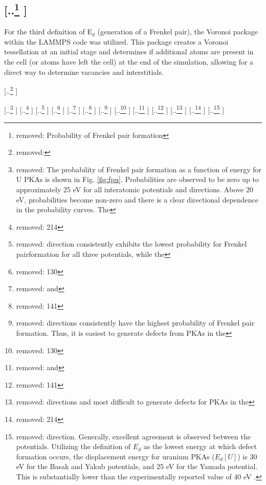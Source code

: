 \documentclass[review]{elsarticle} %
\providecommand{\DIFaddtex}[1]{{\protect\color{blue} \sf #1}} %
\providecommand{\DIFdeltex}[1]{{\protect\color{red} [..\footnote{removed: #1} ]}} %
\providecommand{\DIFaddbegin}{} %
\providecommand{\DIFaddend}{} %
\providecommand{\DIFdelbegin}{} %
\providecommand{\DIFdelend}{} %
\providecommand{\DIFadd}[1]{\texorpdfstring{\DIFaddtex{#1}}{#1}} %
\providecommand{\DIFdel}[1]{\texorpdfstring{\DIFdeltex{#1}}{}} %
\newcommand{\DIFscaledelfig}{0.5}
\newlength{\DIFdelgraphicswidth} %
\newlength{\DIFdelgraphicsheight} %
\newcommand{\DIFaddincludegraphics}[2][]{{\color{blue}\fbox{\DIFOincludegraphics[#1]{#2}}}} %
\newcommand{\DIFdelincludegraphics}[2][]{%
\sbox{\DIFdelgraphicsbox}{\DIFOincludegraphics[#1]{#2}}%
\settoboxwidth{\DIFdelgraphicswidth}{\DIFdelgraphicsbox} %
\settoboxtotalheight{\DIFdelgraphicsheight}{\DIFdelgraphicsbox} %
\scalebox{\DIFscaledelfig}{%
\parbox[b]{\DIFdelgraphicswidth}{\usebox{\DIFdelgraphicsbox}\\[-\baselineskip] \rule{\DIFdelgraphicswidth}{0em}}\llap{\resizebox{\DIFdelgraphicswidth}{\DIFdelgraphicsheight}{%
\setlength{\unitlength}{\DIFdelgraphicswidth}%
\begin{picture}(1,1)%
\thicklines\linethickness{2pt} %
{\color[rgb]{1,0,0}\put(0,0){\framebox(1,1){}}}%
{\color[rgb]{1,0,0}\put(0,0){\line( 1,1){1}}}%
{\color[rgb]{1,0,0}\put(0,1){\line(1,-1){1}}}%
\end{picture}%
}\hspace*{3pt}}} %
} %
\DeclareRobustCommand{\DIFaddbegin}{\DIFOaddbegin \let\includegraphics\DIFaddincludegraphics} %
\DeclareRobustCommand{\DIFaddend}{\DIFOaddend \let\includegraphics\DIFOincludegraphics} %
\DeclareRobustCommand{\DIFdelbegin}{\DIFOdelbegin \let\includegraphics\DIFdelincludegraphics} %
\DeclareRobustCommand{\DIFdelend}{\DIFOaddend \let\includegraphics\DIFOincludegraphics} %
\begin{document}
\DIFdelbegin \subsection{\DIFdel{Probability of Frenkel pair formation}}
\addtocounter{subsection}{-1}%
\DIFdelend \DIFaddbegin \DIFadd{For the third definition of E$_d$ (generation of a Frenkel pair), the Voronoi package within the LAMMPS code \cite{lammps,voro} was utilized. This package creates a Voronoi tessellation at an initial stage and determines if additional atoms are present in the cell (or atoms have left the cell) at the end of the simulation, allowing for a direct way to determine vacancies and interstitials.
}\DIFaddend 

\DIFdelbegin \DIFdel{\hspace{5mm}
}%

\DIFdel{The probability of Frenkel pair formation as a function of energy for U PKAs is shown in Fig. \ref{fig:fpu}. Probabilities are observed to be zero up to approximately 25 eV for all interatomic potentials and directions. Above 20 eV, probabilities become non-zero and there is a clear directional dependence in the probability curves. The }%
\DIFdel{214}%
\DIFdel{direction consistently exhibits the lowest probability for Frenkel pairformation for all three potentials, while the }%
\DIFdel{130}%
\DIFdel{and }%
\DIFdel{141}%
\DIFdel{directions consistently have the highest probability of Frenkel pair formation. Thus, it is easiest to generate defects from PKAs in the }%
\DIFdel{130}%
\DIFdel{and }%
\DIFdel{141}%
\DIFdel{directions and most difficult to generate defects for PKAs in the }%
\DIFdel{214}%
\DIFdel{direction. Generally, excellent agreement is observed between the potentials. Utilizing the definition of $E_d$ as the lowest energy at which defect formation occurs, the displacement energy for uranium PKAs ($E_d [U]$) is 30 eV for the Basak and Yakub potentials, and 25 eV for the Yamada potential.
This is substantially lower than the experimentally reported value of 40 eV \cite{soullard1977,soullard1985}.
}%
\end{document}
